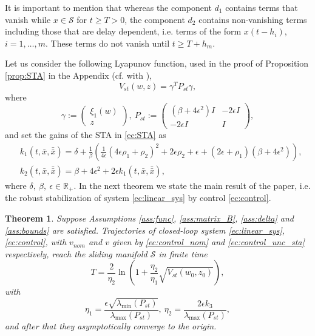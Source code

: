 \documentclass[onecolumn]{IEEEtran}
\newtheorem{theo}{Theorem}
\begin{document}
It is important to mention that whereas the component $d_1$ contains terms that vanish while $x\in \mathcal{S}$ for $t\geq T>0$, the component $d_2$ contains non-vanishing terms including those that are delay dependent, {i.e.} terms of the form $x(t-h_i)$, $i=1,\ldots,m$. These terms do not vanish until $t\geq T+h_{m}$. 

Let us consider the following Lyapunov function,  used in the proof of  Proposition \ref{prop:STA} in the Appendix (cf. with \cite{Moreno2011, Vidaletal2016}),
\begin{equation*}
V_{st}(w,z)=\gamma^TP_{st}\gamma,
\end{equation*}
where
\begin{equation*}
\gamma:=\begin{pmatrix}
\xi_1(w)\\ z
\end{pmatrix},\:P_{st}:=\begin{pmatrix}
\left(\beta +4\epsilon^2\right) I & -2\epsilon I \\
-2\epsilon I & I
\end{pmatrix},
\end{equation*}
and set the gains of the STA in \eqref{ec:STA} as
\begin{equation}
\label{ec:gains}
\begin{split}
&k_1(t,\bar x,\bar {\bar{x}})=\delta+\frac{1}{\beta}\left(\frac{1}{4\epsilon}\left(4\epsilon \rho_1+\rho_2\right)^2+2\epsilon \rho_2 +\epsilon+(2\epsilon+\rho_1)\left(\beta+4\epsilon^2\right)\right),\\
&k_2(t,\bar x,\bar {\bar{x}})=\beta+4\epsilon^2+2\epsilon k_1(t,\bar x,\bar {\bar{x}}),
\end{split}
\end{equation}
where $\delta,\: \beta,\:\epsilon \in \mathbb{R}_+$. In the next theorem we state the main result of the paper,  i.e. the robust stabilization of system \eqref{ec:linear_sys} by control \eqref{ec:control}.
\begin{theo}
	Suppose Assumptions \ref{ass:func}, \ref{ass:matrix_B}, \ref{ass:delta} and \ref{ass:bounds} are satisfied. Trajectories of closed-loop system \eqref{ec:linear_sys}, \eqref{ec:control}, with $v_{nom}$ and $v$ given by \eqref{ec:control_nom} and \eqref{ec:control_unc_sta} respectively, reach the sliding manifold $\mathcal{S}$  in finite time 
	\begin{equation*}
	T=\dfrac{2}{\eta_2}\ln \left(1+\dfrac{\eta_2}{\eta_1}\sqrt{V_{st}(w_0,z_0)}\right),
	\end{equation*}
	with
	\begin{equation*}
	\eta_1=\frac{\epsilon \sqrt{\lambda_{\min} (P_{st})}}{\lambda_{\max}(P_{st})},\:\eta_2=\frac{2\epsilon k_3}{\lambda_{\max}(P_{st})},
	\end{equation*}
	and after that they asymptotically  converge to the origin.
\end{theo}
\end{document}

